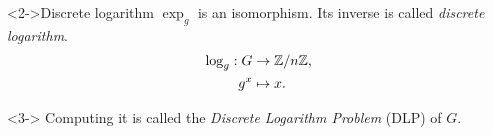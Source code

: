 \documentclass[10pt]{beamer}
\begin{document}
\begin{frame}[fragile]
\begin{columns}
\begin{column}{0.6\textwidth}
      \begin{block}<2->{Discrete logarithm} $\exp_g$ is an
        isomorphism. Its inverse is called \emph{discrete logarithm}.
        \begin{align*}
          \log_g : G &\rightarrow \mathbb{Z}/n\mathbb{Z}\text{,}\\
          g^x&\mapsto x\text{.}
        \end{align*}

        \begin{uncoverenv}<3-> Computing it is called the
          \alert{\emph{Discrete Logarithm Problem}} (DLP) of $G$.
        \end{uncoverenv}
      \end{block}
    \end{column}
  \end{columns}
\end{frame}
\end{document}
